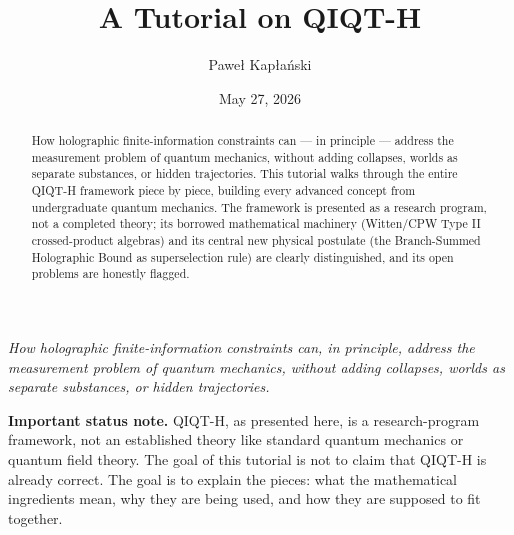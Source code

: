 \documentclass[11pt,a4paper]{article}
\title{A Tutorial on QIQT-H}
\author{Paweł Kapłański}
\date{May 27, 2026}
\newenvironment{qiqtquote}{\begin{mdframed}[style=quotestyle]}{\end{mdframed}}
\begin{document}
\maketitle

\begin{abstract}
\noindent How holographic finite-information constraints can --- in principle --- address the measurement problem of quantum mechanics, without adding collapses, worlds as separate substances, or hidden trajectories. This tutorial walks through the entire QIQT-H framework piece by piece, building every advanced concept from undergraduate quantum mechanics. The framework is presented as a research program, not a completed theory; its borrowed mathematical machinery (Witten/CPW Type II crossed-product algebras) and its central new physical postulate (the Branch-Summed Holographic Bound as superselection rule) are clearly distinguished, and its open problems are honestly flagged.

\end{abstract}

\tableofcontents
\newpage

\emph{How holographic finite-information constraints can, in principle, address the measurement problem of quantum mechanics, without adding collapses, worlds as separate substances, or hidden trajectories.}

\begin{qiqtquote}
\textbf{Important status note.} QIQT-H, as presented here, is a research-program framework, not an established theory like standard quantum mechanics or quantum field theory. The goal of this tutorial is not to claim that QIQT-H is already correct. The goal is to explain the pieces: what the mathematical ingredients mean, why they are being used, and how they are supposed to fit together.
\end{qiqtquote}
\end{document}
